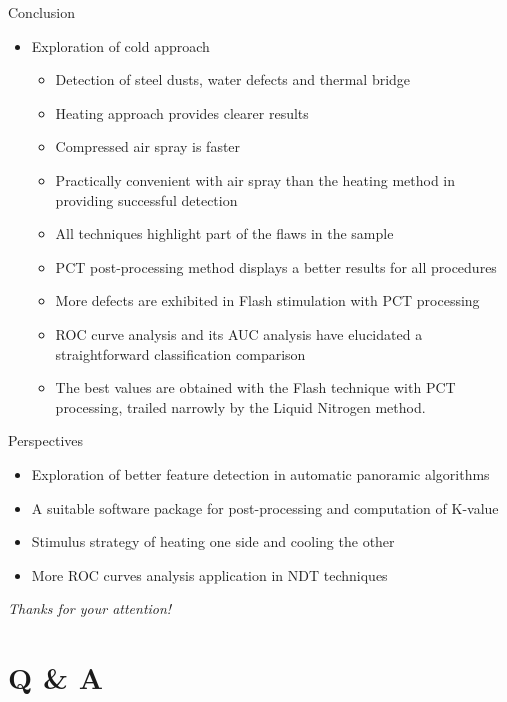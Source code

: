 \documentclass{beamer}
\begin{document}
\begin{frame}{Conclusion}
    \begin{itemize}%
        \item Exploration of cold approach
        \begin{itemize}
	        \item Detection of steel dusts, water defects and thermal bridge 
	        \item Heating approach provides clearer results
	        \item Compressed air spray is faster  
	        \item Practically convenient with air spray than the heating method in providing successful detection
	        \pause
	        \bigskip
	        \item All techniques highlight part of the flaws in the sample
	        \item PCT post-processing method displays a better results for all procedures
	        \item More defects are exhibited in Flash stimulation with PCT processing
	        \item ROC curve analysis and its AUC analysis have elucidated a  straightforward classification comparison
	        \item The best values are obtained with the Flash technique with PCT processing, trailed narrowly by the Liquid Nitrogen method.	        
        \end{itemize}
    \end{itemize}
\end{frame}

\begin{frame}{Perspectives}
	\large
	\begin{itemize}
		\item Exploration of better feature detection in automatic panoramic algorithms
		\item  A suitable software package for post-processing and computation of K-value
		\item Stimulus strategy of heating one side and cooling the other
		\item More ROC curves analysis application in NDT techniques 
	\end{itemize}
\end{frame}


\begin{frame}
	\centering
	\Huge{\textsf{\textit{Thanks for your attention!}}}
\end{frame}

\section*{Q \& A}

\end{document}
